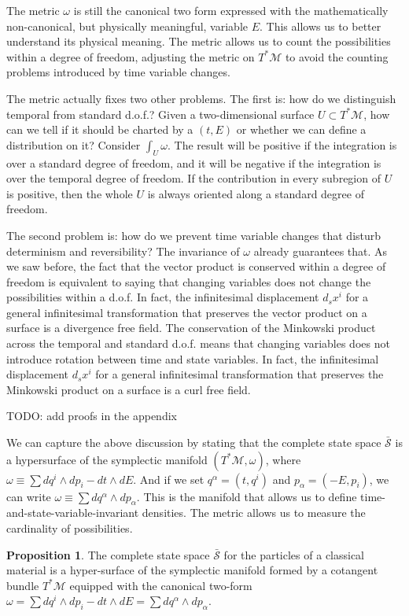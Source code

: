 \documentclass[aps,pra,10pt,twocolumn,floatfix,nofootinbib]{revtex4-1}
\numberwithin{equation}{section}
\theoremstyle{definition}
\newtheorem{prop}[equation]{Proposition}
\begin{document}
The metric $\omega$ is still the canonical two form expressed with the mathematically non-canonical, but physically meaningful, variable $E$. This allows us to better understand its physical meaning. The metric allows us to count the possibilities within a degree of freedom, adjusting the metric on $T^*\mathcal{M}$ to avoid the counting problems introduced by time variable changes.

The metric actually fixes two other problems. The first is: how do we distinguish temporal from standard d.o.f.? Given a two-dimensional surface $U \subset T^*\mathcal{M}$, how can we tell if it should be charted by a $(t,E)$ or whether we can define a distribution on it? Consider $\int_U \omega$. The result will be positive if the integration is over a standard degree of freedom, and it will be negative if the integration is over the temporal degree of freedom. If the contribution in every subregion of $U$ is positive, then the whole $U$ is always oriented along a standard degree of freedom.

The second problem is: how do we prevent time variable changes that disturb determinism and reversibility? The invariance of $\omega$ already guarantees that. As we saw before, the fact that the vector product is conserved within a degree of freedom is equivalent to saying that changing variables does not change the possibilities within a d.o.f. In fact, the infinitesimal displacement $d_s x^i$ for a general infinitesimal transformation that preserves the vector product on a surface is a divergence free field. The conservation of the Minkowski product across the temporal and standard d.o.f. means that changing variables does not introduce rotation between time and state variables. In fact, the infinitesimal displacement $d_s x^i$ for a general infinitesimal transformation that preserves the Minkowski product on a surface is a curl free field.

TODO: add proofs in the appendix

We can capture the above discussion by stating that the complete state space $\bar{\mathcal{S}}$ is a hypersurface of the symplectic manifold $(T^*\mathcal{M}, \omega)$, where $\omega \equiv \sum dq^i \wedge dp_i - dt \wedge dE$. And if we set $q^\alpha = (t, q^i)$ and $p_\alpha = (-E, p_i)$, we can write $\omega \equiv \sum dq^\alpha \wedge dp_\alpha$. This is the manifold that allows us to define time-and-state-variable-invariant densities. The metric allows us to measure the cardinality of possibilities.

\begin{prop}\label{relativistic_symplectic_manifold}
	The complete state space $\bar{\mathcal{S}}$ for the particles of a classical material is a hyper-surface of the symplectic manifold formed by a cotangent bundle $T^*\mathcal{M}$ equipped with the canonical two-form $\omega = \sum dq^i \wedge dp_i - dt \wedge dE = \sum dq^\alpha \wedge dp_\alpha$.
\end{prop}
\end{document}
